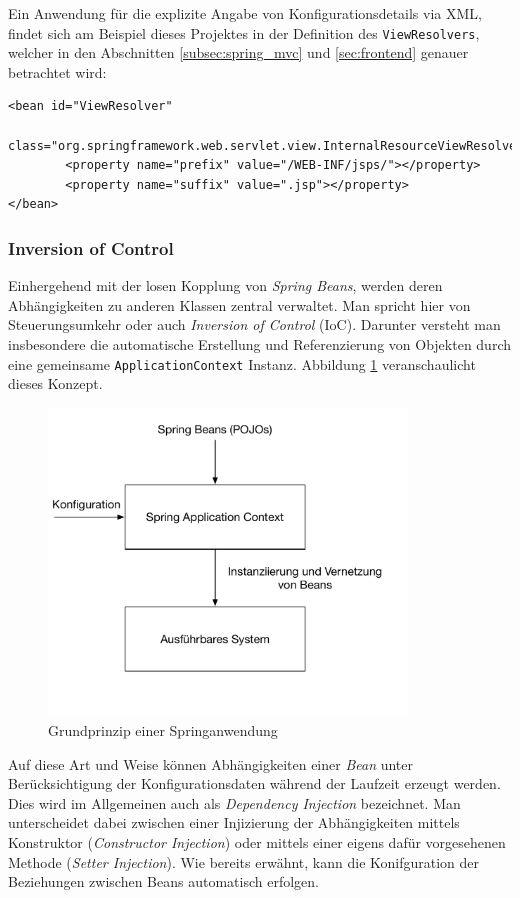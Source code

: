 \newpage
Ein Anwendung für die explizite Angabe von Konfigurationsdetails via XML, findet sich am Beispiel dieses Projektes in der Definition des \texttt{ViewResolvers}, welcher in den Abschnitten \ref{subsec:spring_mvc} und \ref{sec:frontend} genauer betrachtet wird:
\smallskip
\begin{lstlisting}[style=XML]
<bean id="ViewResolver"
		class="org.springframework.web.servlet.view.InternalResourceViewResolver">
		<property name="prefix" value="/WEB-INF/jsps/"></property>
		<property name="suffix" value=".jsp"></property>
</bean>
\end{lstlisting} 
\medskip 

\subsubsection*{Inversion of Control}
Einhergehend mit der losen Kopplung von \textit{Spring Beans}, werden deren Abhängigkeiten zu anderen Klassen zentral verwaltet. Man spricht hier von Steuerungsumkehr oder auch \textit{Inversion of Control} (\acs{IoC}). Darunter versteht man insbesondere die automatische Erstellung und
	Referenzierung von Objekten durch eine gemeinsame \texttt{ApplicationContext} Instanz. Abbildung \ref{fig:spring_context} veranschaulicht dieses Konzept.	
\begin{figure}[!h]
    \centering
    \includegraphics[width=0.85\textwidth]{Graphics/spring_context}
    \caption[Grundprinzip einer Springanwendung, in Anlehnung an: \cite{tuto:ioc}]{Grundprinzip einer Springanwendung \cite{tuto:ioc}}
   \label{fig:spring_context}
\end{figure}
%
Auf diese Art und Weise können Abhängigkeiten einer \textit{Bean} unter Berücksichtigung der Konfigurationsdaten während der Laufzeit erzeugt werden. Dies wird im Allgemeinen auch als \textit{Dependency Injection} bezeichnet. Man unterscheidet dabei zwischen einer Injizierung der Abhängigkeiten mittels Konstruktor (\textit{Constructor Injection}) oder mittels einer eigens dafür vorgesehenen Methode (\textit{Setter Injection}). Wie bereits erwähnt, kann die Konifguration der Beziehungen zwischen Beans automatisch erfolgen.
\newpage
